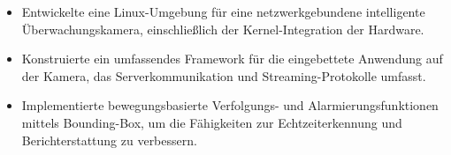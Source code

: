 \begin{itemize}
  \item Entwickelte eine Linux-Umgebung für eine netzwerkgebundene intelligente Überwachungskamera, einschließlich der Kernel-Integration der Hardware.
  \item Konstruierte ein umfassendes Framework für die eingebettete Anwendung auf der Kamera, das Serverkommunikation und Streaming-Protokolle umfasst.
  \item Implementierte bewegungsbasierte Verfolgungs- und Alarmierungsfunktionen mittels Bounding-Box, um die Fähigkeiten zur Echtzeiterkennung und Berichterstattung zu verbessern.
\end{itemize}
\divider
